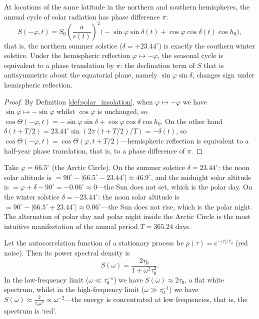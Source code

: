 \begin{proposition}\label{prop:seasonal_phase_symmetry}
At locations of the same latitude in the northern and southern hemispheres, the annual cycle of solar radiation has phase difference $\pi$:
\[
S(-\varphi, t) = S_0\left(\frac{a}{r(t)}\right)^2 \big(-\sin\varphi \sin\delta(t) + \cos\varphi \cos\delta(t) \cos h_0 \big),
\]
that is, the northern summer solstice ($\delta = +23.44^\circ$) is exactly the southern winter solstice. Under the hemispheric reflection $\varphi \mapsto -\varphi$, the seasonal cycle is equivalent to a phase translation by $\pi$: the declination term of $S$ that is antisymmetric about the equatorial plane, namely $\sin\varphi\sin\delta$, changes sign under hemispheric reflection.
\end{proposition}

\begin{proof}
By Definition \ref{def:solar_insolation}, when $\varphi \mapsto -\varphi$ we have $\sin\varphi \mapsto -\sin\varphi$ whilst $\cos\varphi$ is unchanged, so $\cos\Theta(-\varphi,t) = -\sin\varphi\sin\delta + \cos\varphi\cos\delta\cos h_0$. On the other hand $\delta(t + T/2) = 23.44^\circ\sin(2\pi(t+T/2)/T) = -\delta(t)$, so $\cos\Theta(-\varphi, t) = \cos\Theta(\varphi, t + T/2)$---hemispheric reflection is equivalent to a half-year phase translation, that is, to a phase difference of $\pi$.
\end{proof}

\begin{example}\label{ex:polar_day_night}
Take $\varphi = 66.5^\circ$ (the Arctic Circle). On the summer solstice $\delta = 23.44^\circ$: the noon solar altitude is $= 90^\circ - |66.5^\circ - 23.44^\circ| \approx 46.9^\circ$, and the midnight solar altitude is $= \varphi + \delta - 90^\circ = -0.06^\circ \approx 0$---the Sun does not set, which is the polar day. On the winter solstice $\delta = -23.44^\circ$: the noon solar altitude is $= 90^\circ - |66.5^\circ + 23.44^\circ| \approx 0.06^\circ$---the Sun does not rise, which is the polar night. The alternation of polar day and polar night inside the Arctic Circle is the most intuitive manifestation of the annual period $T = 365.24$ days.
\end{example}

\begin{lemma}\label{ch28_red_noise_duality}
Let the autocorrelation function of a stationary process be $\rho(\tau) = e^{-|\tau|/\tau_0}$ (red noise). Then its power spectral density is
\[
S(\omega) = \frac{2\tau_0}{1 + \omega^2 \tau_0^2}.
\]
In the low-frequency limit ($\omega \ll \tau_0^{-1}$) we have $S(\omega) \approx 2\tau_0$, a flat white spectrum, whilst in the high-frequency limit ($\omega \gg \tau_0^{-1}$) we have $S(\omega) \approx \frac{2}{\tau_0 \omega^2} \propto \omega^{-2}$---the energy is concentrated at low frequencies, that is, the spectrum is `red'.
\end{lemma}

